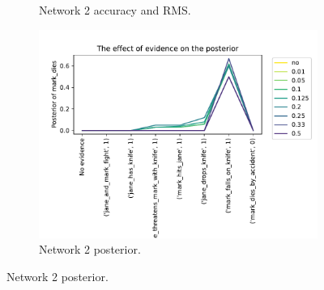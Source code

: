 \begin{enumerate}
\begin{figure}[htbp]
\begin{subfigure}{.5\textwidth}
\caption{Network 2 accuracy and RMS.}
\label{kb2a1}
\end{subfigure}%
\begin{subfigure}{.5\textwidth}
 \centering
\includegraphics[width=0.9\linewidth]{../experiments/VlekNetwork/plots/posterior_KB2.pdf}
\caption{Network 2 posterior.}
\label{kb2p}
\end{subfigure}


\end{figure}
\end{enumerate}
